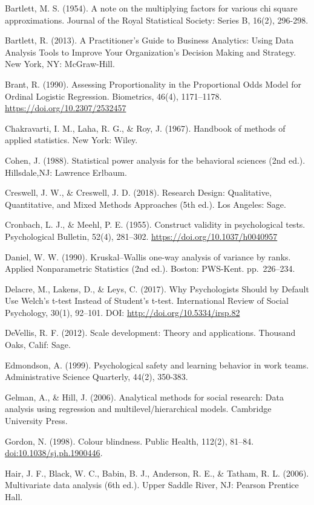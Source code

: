 \documentclass[
]{book}
\begin{document}
Bartlett, M. S. (1954). A note on the multiplying factors for various chi square approximations. Journal of the Royal Statistical Society: Series B, 16(2), 296-298.

Bartlett, R. (2013). A Practitioner's Guide to Business Analytics: Using Data Analysis Tools to Improve Your Organization's Decision Making and Strategy. New York, NY: McGraw-Hill.

Brant, R. (1990). Assessing Proportionality in the Proportional Odds Model for Ordinal Logistic Regression. Biometrics, 46(4), 1171--1178. \url{https://doi.org/10.2307/2532457}

Chakravarti, I. M., Laha, R. G., \& Roy, J. (1967). Handbook of methods of applied statistics. New York: Wiley.

Cohen, J. (1988). Statistical power analysis for the behavioral sciences (2nd ed.). Hillsdale,NJ: Lawrence Erlbaum.

Creswell, J. W., \& Creswell, J. D. (2018). Research Design: Qualitative, Quantitative, and Mixed Methods Approaches (5th ed.). Los Angeles: Sage.

Cronbach, L. J., \& Meehl, P. E. (1955). Construct validity in psychological tests. Psychological Bulletin, 52(4), 281--302. \url{https://doi.org/10.1037/h0040957}

Daniel, W. W. (1990). Kruskal--Wallis one-way analysis of variance by ranks. Applied Nonparametric Statistics (2nd ed.). Boston: PWS-Kent. pp.~226--234.

Delacre, M., Lakens, D., \& Leys, C. (2017). Why Psychologists Should by Default Use Welch's t-test Instead of Student's t-test. International Review of Social Psychology, 30(1), 92--101. DOI: \url{http://doi.org/10.5334/irsp.82}

DeVellis, R. F. (2012). Scale development: Theory and applications. Thousand Oaks, Calif: Sage.

Edmondson, A. (1999). Psychological safety and learning behavior in work teams. Administrative Science Quarterly, 44(2), 350-383.

Gelman, A., \& Hill, J. (2006). Analytical methods for social research: Data analysis using regression and multilevel/hierarchical models. Cambridge University Press.

Gordon, N. (1998). Colour blindness. Public Health, 112(2), 81--84. \url{doi:10.1038/sj.ph.1900446}.

Hair, J. F., Black, W. C., Babin, B. J., Anderson, R. E., \& Tatham, R. L. (2006). Multivariate data analysis (6th ed.). Upper Saddle River, NJ: Pearson Prentice Hall.
\end{document}
